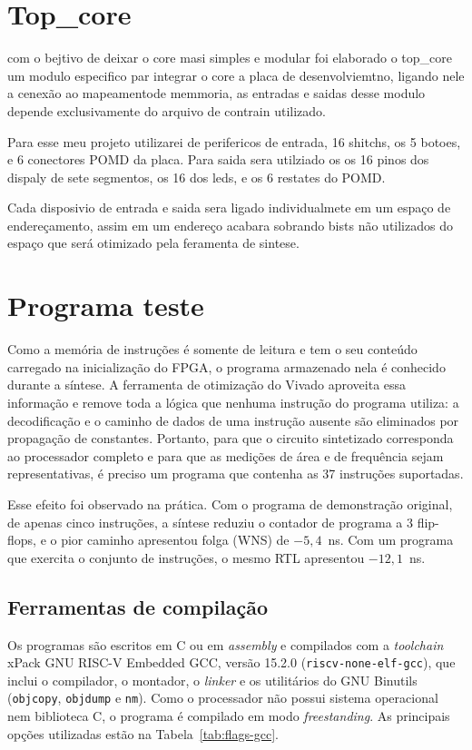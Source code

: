 \section{Top\_core}
\label{sec:top_core}

com o bejtivo de deixar o core masi simples e modular foi elaborado o top_core um modulo especifico par integrar o core a placa de desenvolviemtno, ligando nele a cenexão ao mapeamentode memmoria, as entradas e saidas desse modulo depende exclusivamente do arquivo de contrain utilizado.

Para esse meu projeto utilizarei de perifericos de entrada, 16 shitchs, os 5 botoes, e 6 conectores POMD da placa. Para saida sera utilziado os os 16 pinos dos dispaly de sete segmentos, os 16 dos leds, e os 6 restates do POMD. 

Cada disposivio de entrada e saida sera ligado individualmete em um espaço de endereçamento, assim em um endereço acabara sobrando bists não utilizados do espaço que será otimizado pela feramenta de sintese. 

\section{Programa teste}
\label{sec:programa-teste}

Como a memória de instruções é somente de leitura e tem o seu conteúdo
carregado na inicialização do FPGA, o programa armazenado nela é conhecido
durante a síntese. A ferramenta de otimização do Vivado aproveita essa
informação e remove toda a lógica que nenhuma instrução do programa utiliza:
a decodificação e o caminho de dados de uma instrução ausente são eliminados
por propagação de constantes. Portanto, para que o circuito sintetizado
corresponda ao processador completo e para que as medições de área e de
frequência sejam representativas, é preciso um programa que contenha as 37
instruções suportadas.

Esse efeito foi observado na prática. Com o programa de demonstração
original, de apenas cinco instruções, a síntese reduziu o contador de
programa a 3 flip-flops, e o pior caminho apresentou folga (WNS) de
$-5{,}4$~ns. Com um programa que exercita o conjunto de instruções, o mesmo
RTL apresentou $-12{,}1$~ns.

\subsection{Ferramentas de compilação}

Os programas são escritos em C ou em \textit{assembly} e compilados com a
\textit{toolchain} xPack GNU RISC-V Embedded GCC, versão 15.2.0
(\texttt{riscv-none-elf-gcc}), que inclui o compilador, o montador, o
\textit{linker} e os utilitários do GNU Binutils (\texttt{objcopy},
\texttt{objdump} e \texttt{nm}). Como o processador não possui sistema
operacional nem biblioteca C, o programa é compilado em modo
\textit{freestanding}. As principais opções utilizadas estão na
Tabela~\ref{tab:flags-gcc}.

